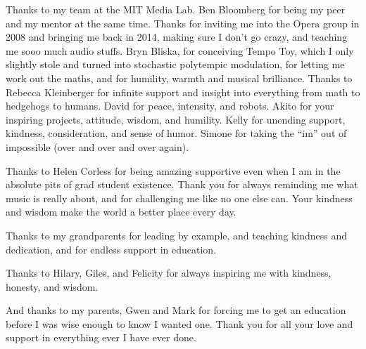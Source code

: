 \begin{fullwidth}
\vspace{5mm}
\noindent Thanks to my team at the MIT Media Lab. Ben Bloomberg for being my peer
and my mentor at the same time. Thanks for inviting me into the Opera
group in 2008 and bringing me back in 2014, making sure I don't go
crazy, and teaching me sooo much audio stuffs. Bryn Bliska, for
conceiving Tempo Toy, which I only slightly stole and turned into
stochastic polytempic modulation, for letting me work out the maths,
and for humility, warmth and musical brilliance. Thanks to Rebecca
Kleinberger for infinite support and insight into everything from
math to hedgehogs to humans. David for peace, intensity, and
robots. Akito for your inspiring projects, attitude, wisdom, and
humility. Kelly for unending support, kindness, consideration, and
sense of humor. Simone for taking the ``im'' out of impossible (over
and over and over again).

\vspace{5mm}
\noindent Thanks to Helen Corless for being amazing supportive even
when I am in the absolute pits of grad student existence. Thank you
for always reminding me what music is really about, and for
challenging me like no one else can. Your kindness and wisdom make
the world a better place every day.

\vspace{5mm}
\noindent Thanks to my grandparents for leading by example, and teaching
kindness and dedication, and for endless support in education.

\vspace{5mm}
\noindent Thanks to Hilary, Giles, and Felicity for always inspiring me with
kindness, honesty, and wisdom.

\vspace{5mm}
\noindent And thanks to my parents, Gwen and Mark for forcing me to get an
education before I was wise enough to know I wanted one. Thank you for
all your love and support in everything ever I have ever done.
\end{fullwidth}
